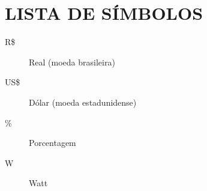 
\chapter*{LISTA DE SÍMBOLOS}           %

\begin{description}
	\item[R\$]   Real (moeda brasileira)
	\item[US\$]  Dólar (moeda estadunidense)
	\item[\%]    Porcentagem
	\item[W]     Watt
\end{description}
\cleardoublepage                       %